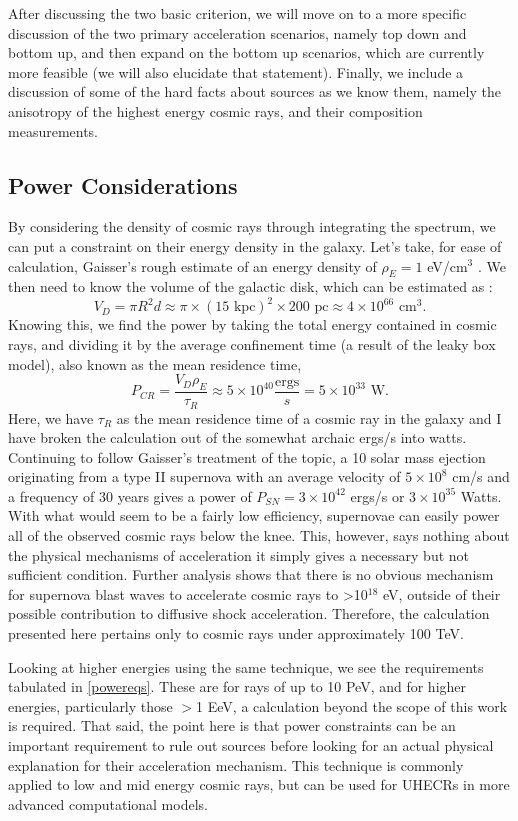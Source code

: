 After discussing the two basic criterion, we will move on to a more specific discussion of the two primary acceleration scenarios, namely top down and bottom up, and then expand on the bottom up scenarios, which are currently more feasible (we will also elucidate that statement). Finally, we include a discussion of some of the hard facts about sources as we know them, namely the anisotropy of the highest energy cosmic rays, and their composition measurements.

\subsection{Power Considerations}
By considering the density of cosmic rays through integrating the spectrum, we can put a constraint on their energy density in the galaxy. Let's take, for ease of calculation, Gaisser's rough estimate of an energy density of $\rho_E=1$ eV/cm$^3$ \cite{crapp}. We then need to know the volume of the galactic disk, which can be estimated as :
$$V_D=\pi R^2 d\approx \pi \times (15\mbox{ kpc})^2\times200\mbox{ pc}\approx4\times10^{66}\mbox{ cm}^3.$$
Knowing this, we find the power by taking the total energy contained in cosmic rays, and dividing it by the average confinement time (a result of the leaky box model), also known as the mean residence time,
 $$P_{CR}=\frac{V_D \rho_E}{\tau_R}\approx 5\times10^{40} \frac{\mbox{ergs}}{s}=5\times10^{33}\mbox{ W}.$$
 Here, we have $\tau_R$ as the mean residence time of a cosmic ray in the galaxy and I have broken the calculation out of the somewhat archaic ergs/s into watts. Continuing to follow Gaisser's treatment of the topic, a 10 solar mass ejection originating from a type II supernova with an average velocity of $5\times 10^8$ cm/s and a frequency of 30 years gives a power of $P_{SN}=3\times10^{42}$ ergs/s or $3\times 10^{35}$ Watts. With what would seem to be a fairly low efficiency, supernovae can easily power all of the observed cosmic rays below the knee. This, however, says nothing about the physical mechanisms of acceleration it simply gives a necessary but not sufficient condition. Further analysis shows that there is no obvious mechanism for supernova blast waves to accelerate cosmic rays to \textgreater 10$^{18}$ eV, outside of their possible contribution to diffusive shock acceleration. Therefore, the calculation presented here pertains only to cosmic rays under approximately 100 TeV. 
 
 Looking at higher energies using the same technique, we see the requirements tabulated in \autoref{powereqs}. These are for rays of up to 10 PeV, and for higher energies, particularly those $>$1 EeV, a calculation beyond the scope of this work is required. That said, the point here is that power constraints can be an important requirement to rule out sources before looking for an actual physical explanation for their acceleration mechanism. This technique is commonly applied to low and mid energy cosmic rays, but can be used for UHECRs in more advanced computational models.

